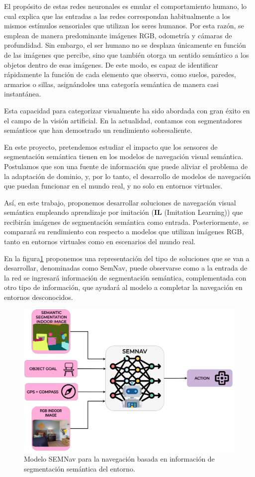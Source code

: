 El propósito de estas redes neuronales es emular el comportamiento humano, lo cual explica que las entradas a las redes correspondan habitualmente a los mismos estímulos sensoriales que utilizan los seres humanos.
Por esta razón, se emplean de manera predominante imágenes RGB, odometría y cámaras de profundidad.
Sin embargo, el ser humano no se desplaza únicamente en función de las imágenes que percibe, sino que también otorga un sentido semántico a los objetos dentro de esas imágenes.
De este modo, es capaz de identificar rápidamente la función de cada elemento que observa, como suelos, paredes, armarios o sillas, asignándoles una categoría semántica de manera casi instantánea.

Esta capacidad para categorizar visualmente ha sido abordada con gran éxito en el campo de la visión artificial.
En la actualidad, contamos con segmentadores semánticos que han demostrado un rendimiento sobresaliente\cite{Seichter2020EfficientRS}.

En este proyecto, pretendemos estudiar el impacto que los sensores de segmentación semántica tienen en los modelos de navegación visual semántica.
Postulamos que son una fuente de información que puede aliviar el problema de la adaptación de dominio, y, por lo tanto, el desarrollo de modelos de navegación que puedan funcionar en el mundo real, y no solo en entornos virtuales.

Así, en este trabajo, proponemos desarrollar soluciones de navegación visual semántica empleando aprendizaje por imitación (\textbf{IL} (Imitation Learning)) que recibirán imágenes de segmentación semántica como entrada.
Posteriormente, se comparará su rendimiento con respecto a modelos que utilizan imágenes RGB, tanto en entornos virtuales como en escenarios del mundo real.

En la figura\ref{fig:semnav} proponemos una representación del tipo de soluciones que se van a desarrollar, denominadas como SemNav, puede observarse como a la entrada de la red se ingresará información de segmentación semántica, complementada con otro tipo de información, que ayudará al modelo a completar la navegación en entornos desconocidos.

\begin{figure}
    \centering
    \includegraphics[width=\textwidth]{figuras/semnav_model}
    \caption{Modelo SEMNav para la navegación basada en información de segmentación semántica del entorno.}
    \label{fig:semnav}
\end{figure}
